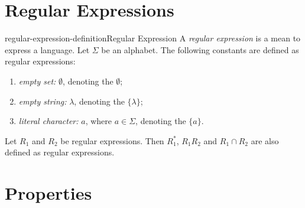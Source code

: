 \documentclass[preview]{standalone}
\newcommand{\emptyString}{\lambda}
\begin{document}
\genpage

\section{Regular Expressions}

\begin{snippetdefinition}{regular-expression-definition}{Regular Expression}
    A \textit{regular expression} is a mean to express a language.
    Let \(\Sigma\) be an alphabet.
    The following constants are defined as regular expressions:
    \begin{enumerate}
        \item \emph{empty set:} \(\emptyset\), denoting the \set \(\emptyset\);
        \item \emph{empty string:} \(\emptyString\), denoting the \set \(\{\emptyString\}\);
        \item \emph{literal character:} \(a\), where \(a \in \Sigma\), denoting the \set \(\{a\}\).
    \end{enumerate}
    Let \(R_1\) and \(R_2\) be regular expressions.
    Then \(R_1^*\), \(R_1 R_2\) and \(R_1 \cap R_2\) are also defined as regular expressions.
\end{snippetdefinition}


\section{Properties}
\end{document}
